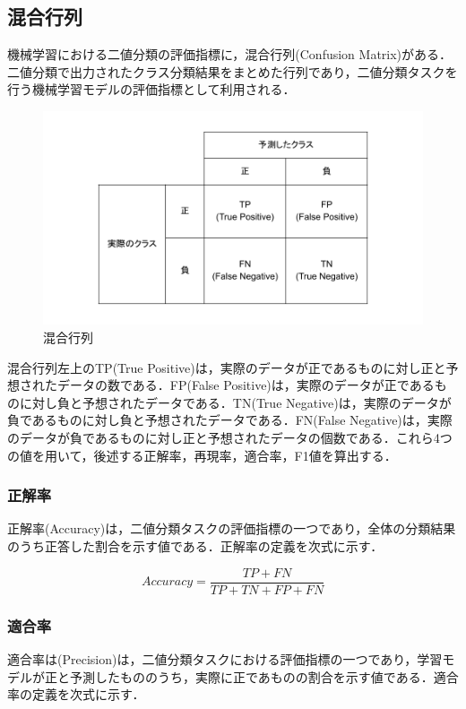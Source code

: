 \subsection{混合行列 \label{c4s2-1}}
機械学習における二値分類の評価指標に，混合行列(Confusion Matrix)がある．二値分類で出力されたクラス分類結果をまとめた行列であり，二値分類タスクを行う機械学習モデルの評価指標として利用される．
 
\begin{figure}[H]
	\centering
	\includegraphics[width=150mm]{image/confusion-matrix.png}
	\caption{混合行列}
	\label{confusion-matrix}
\end{figure}

混合行列左上のTP(True Positive)は，実際のデータが正であるものに対し正と予想されたデータの数である．FP(False Positive)は，実際のデータが正であるものに対し負と予想されたデータである．TN(True Negative)は，実際のデータが負であるものに対し負と予想されたデータである．FN(False Negative)は，実際のデータが負であるものに対し正と予想されたデータの個数である．これら4つの値を用いて，後述する正解率，再現率，適合率，F1値を算出する．

\subsubsection{正解率 \label{c4s2-1a}}
正解率(Accuracy)は，二値分類タスクの評価指標の一つであり，全体の分類結果のうち正答した割合を示す値である．正解率の定義を次式に示す．

$$
Accuracy = \frac{TP+FN}{TP+TN+FP+FN}
$$


\subsubsection{適合率 \label{c4s2-1b}}
適合率は(Precision)は，二値分類タスクにおける評価指標の一つであり，学習モデルが正と予測したもののうち，実際に正であものの割合を示す値である．適合率の定義を次式に示す．

